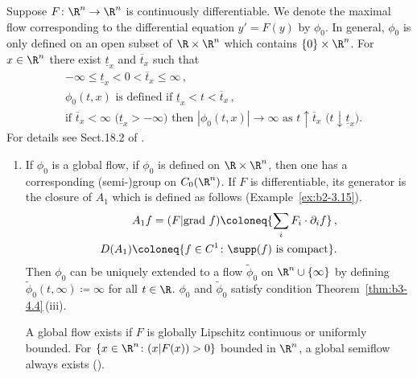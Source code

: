 \begin{example}\label{ex:b3-4.6}
	Suppose $F \colon \R^n \to \R^n$ is continuously differentiable.
	We denote the maximal flow corresponding to the differential equation%
    $y' = F(y)$ by $\phi_{0}$.
	In general, $\phi_{0}$ is only defined on an open subset of\/ $\R \times \R^n$ which contains $\{0\} \times \R^n$.
	For $x \in \R^n$ there exist $\underline{t}_{x}$ and $\overline{t}_{x}$ such that
	\begin{equation}\label{eq:b3-4.11}
		\begin{aligned}
			&-\infty \leq \underline{t}_{x} < 0 < \overline{t}_{x} \leq \infty\,, \\
			&\phi_{0}(t,x) \text{ is defined if } \underline{t}_{x} < t < \overline{t}_{x}\,, \\
			&\text{if } \overline{t}_{x} < \infty \text{ (}\underline{t}_{x} > -\infty\text{)} \text{ then } |\phi_{0}(t,x)| \to \infty \text{ as } t\uparrow\overline{t}_{x} \text{ (}t\downarrow\underline{t}_{x}\text{)}.
		\end{aligned}
	\end{equation}
	For details see Sect.18.2 of \textcite{dieudonne:1971}.
	\begin{enumerate}[\upshape (i), wide, labelindent=.25em]
	\item
	If\/ $\phi_{0}$ is a global flow, \ie if\/ $\phi_{0}$ is defined on $\R \times \R^n$, then one has a corresponding (semi-)group on $C_{0}(\R^n)$.
	If\/ $F$ is differentiable, its generator is the closure of\/ $A_{1}$ which is defined as follows (\cf Example~\ref{ex:b2-3.15}).
	\begin{equation}\label{eq:b3-4.12}
		\begin{aligned}
			A_{1}f = (F|\text{grad }f) \coloneq 
            {  \sum_i F_{i} \cdot \partial_{i}f} \,, \\
			D(A_{1}) \coloneq \{f \in C^1 \colon \supp(f)  \text{ is compact}\}.
		\end{aligned}
	\end{equation}
	Then $\phi_{0}$ can be uniquely extended to a flow $\tilde{\phi}_{0}$ on $\R^n\cup\{\infty\}$ by defining $\tilde{\phi}_{0}(t,\infty) \coloneq \infty$ for all $t \in \R$.
	$\phi_{0}$ and $\tilde{\phi}_{0}$ satisfy condition Theorem~\ref{thm:b3-4.4}\,(iii).

    A global flow exists if\/ $F$ is globally Lipschitz continuous or uniformly bounded. 
    For $\{x \in \R^n \colon (x|F(x)) > 0\}$ bounded in $\R^n$, a global semiflow always exists (\cf \textcite[Section~5.2]{deimling:1977}).
    

\end{enumerate}
\end{example}
